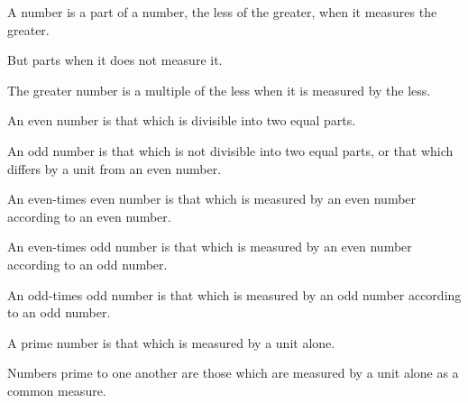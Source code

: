 \begin{scope}
\label{def:VII.3}
A number is a part of a number, the less of the greater, when it
measures the greater.
\end{scope}

\begin{scope}
\label{def:VII.4}
But parts when it does not measure it.
\end{scope}

\begin{scope}
\label{def:VII.5}
The greater number is a multiple of the less when it is measured by
the less.
\end{scope}

\begin{scope}
\label{def:VII.6}
An even number is that which is divisible into two equal parts.
\end{scope}

\begin{scope}
\label{def:VII.7}
An odd number is that which is not divisible into two equal parts, or
that which differs by a unit from an even number.
\end{scope}

\begin{scope}
\label{def:VII.8}
An even-times even number is that which is measured by an even number
according to an even number.
\end{scope}

\begin{scope}
\label{def:VII.9}
An even-times odd number is that which is measured by an even number
according to an odd number.
\end{scope}

\begin{scope}
\label{def:VII.10}
An odd-times odd number is that which is measured by an odd number
according to an odd number.
\end{scope}

\begin{scope}
\label{def:VII.11}
A prime number is that which is measured by a unit alone.
\end{scope}

\begin{scope}
\label{def:VII.12}
Numbers prime to one another are those which are measured by a unit
alone as a common measure.
\end{scope}

